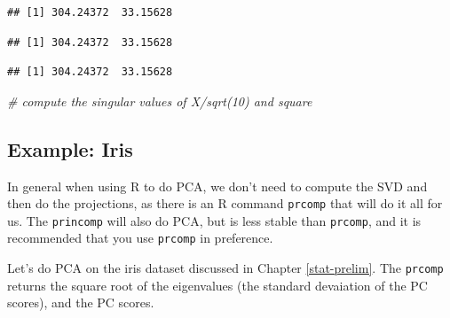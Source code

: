 \documentclass[
]{book}
\newenvironment{Shaded}{\begin{snugshade}}{\end{snugshade}}
\newcommand{\CommentTok}[1]{\textcolor[rgb]{0.56,0.35,0.01}{\textit{#1}}}
\newcommand{\DecValTok}[1]{\textcolor[rgb]{0.00,0.00,0.81}{#1}}
\newcommand{\FunctionTok}[1]{\textcolor[rgb]{0.13,0.29,0.53}{\textbf{#1}}}
\newcommand{\NormalTok}[1]{#1}
\newcommand{\SpecialCharTok}[1]{\textcolor[rgb]{0.81,0.36,0.00}{\textbf{#1}}}
\theoremstyle{definition}
\theoremstyle{definition}
\theoremstyle{definition}
\theoremstyle{definition}
\theoremstyle{remark}
\begin{document}
\begin{verbatim}
## [1] 304.24372  33.15628
\end{verbatim}

\begin{Shaded}
\end{Shaded}

\begin{verbatim}
## [1] 304.24372  33.15628
\end{verbatim}

\begin{Shaded}
\end{Shaded}

\begin{verbatim}
## [1] 304.24372  33.15628
\end{verbatim}

\begin{Shaded}
\begin{Highlighting}[]
\CommentTok{\# compute the singular values of X/sqrt(10) and square}
\end{Highlighting}
\end{Shaded}

\hypertarget{example-iris}{%
\subsection{Example: Iris}\label{example-iris}}

In general when using R to do PCA, we don't need to compute the SVD and then do the projections, as there is an R command \texttt{prcomp} that will do it all for us. The \texttt{princomp} will also do PCA, but is less stable than \texttt{prcomp}, and it is recommended that you use \texttt{prcomp} in preference.

Let's do PCA on the iris dataset discussed in Chapter \ref{stat-prelim}. The \texttt{prcomp} returns the square root of the eigenvalues (the standard devaiation of the PC scores), and the PC scores.
\end{document}
